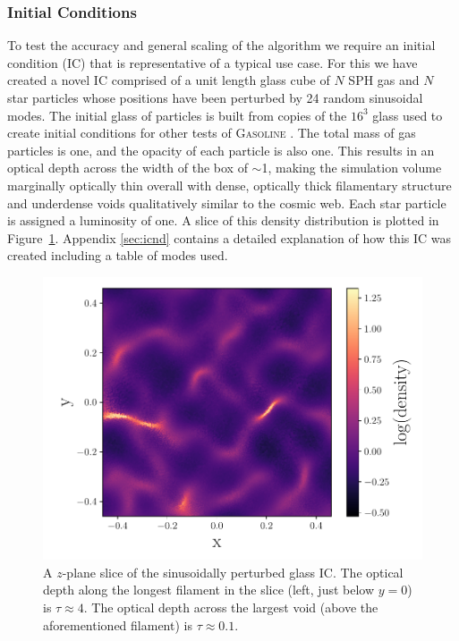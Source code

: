 \documentclass[fleq,usenatbib]{mnras}
\begin{document}
{\subsubsection{Initial Conditions}
To test the accuracy and general scaling of the algorithm we require an 
initial condition (IC) that is representative of a typical use case. For this 
we have created a novel IC comprised of a unit length glass cube of $N$ SPH gas and 
$N$ star particles whose positions have been perturbed by 24 random sinusoidal 
modes. The initial glass of particles is built from copies of the $16^3$ glass 
used to create initial conditions for other tests of \textsc{Gasoline} 
\citep{wadsleyEt17}. The total mass of gas particles is one, and the opacity 
of each particle is also one. This results in an optical depth across the 
width of the box of $\sim$1, making the simulation volume marginally  optically thin 
overall with dense, optically thick filamentary structure and underdense voids 
qualitatively similar to the cosmic web. Each star particle is assigned a 
luminosity of one. A slice of this density distribution is plotted in 
Figure~\ref{fig:sine_rho}. Appendix \ref{sec:icnd} contains a detailed 
explanation of how this IC was created including a table of modes used.
\begin{figure}
\includegraphics[width=1\linewidth]{Figures/sine_rho.pdf}
\caption{A $z$-plane slice of the sinusoidally perturbed glass IC. The optical 
depth along the longest filament in the slice (left, just below $y=0$) is
$\tau\approx 4$. The optical depth across the largest void (above the 
aforementioned filament) is $\tau\approx 0.1$.}
\label{fig:sine_rho}
\end{figure}

}
\end{document}
